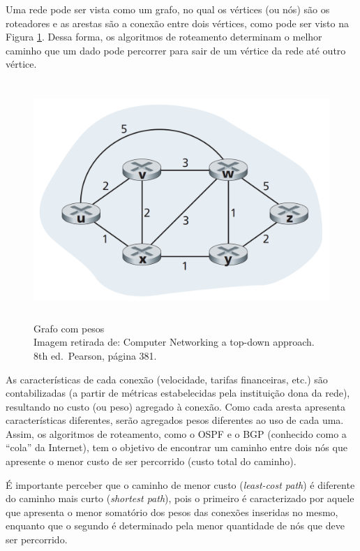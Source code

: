 Uma rede pode ser vista como um grafo, no qual os vértices (ou nós) são
os roteadores e as arestas são a conexão entre dois vértices, como pode
ser visto na Figura \ref{fig:Grafo com pesos}. Dessa forma, os algoritmos de roteamento
determinam o melhor caminho que um dado pode percorrer para sair de um
vértice da rede até outro vértice.

\begin{figure}[H]
\centering
\includegraphics[keepaspectratio, width=12cm, height=9cm]{imagens/14/14 - grafo.png}
\caption{Grafo com pesos \\
Imagem retirada de: Computer Networking a top-down approach. 8th
ed.~Pearson, página 381. \\}
\label{fig:Grafo com pesos}
\end{figure}

As características de cada conexão (velocidade, tarifas financeiras,
etc.) são contabilizadas (a partir de métricas estabelecidas pela
instituição dona da rede), resultando no custo (ou peso) agregado à
conexão. Como cada aresta apresenta características diferentes, serão
agregados pesos diferentes ao uso de cada uma. Assim, os algoritmos de
roteamento, como o OSPF e o BGP (conhecido como a ``cola'' da Internet),
tem o objetivo de encontrar um caminho entre dois nós que apresente o
menor custo de ser percorrido (custo total do caminho).




É importante perceber que o caminho de menor custo (\emph{least-cost
path}) é diferente do caminho mais curto (\emph{shortest path}), pois o
primeiro é caracterizado por aquele que apresenta o menor somatório dos
pesos das conexões inseridas no mesmo, enquanto que o segundo é
determinado pela menor quantidade de nós que deve ser percorrido.

